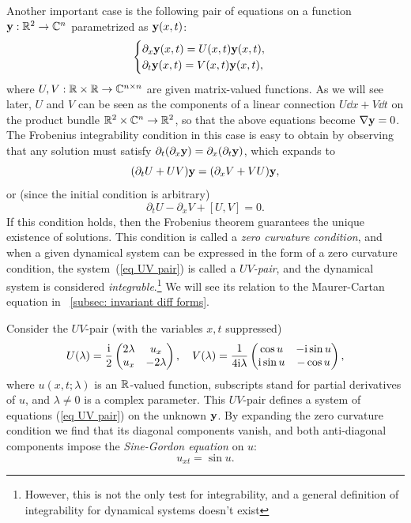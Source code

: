 \begin{example}\label{ex UV pairs}
    Another important case is the following pair of equations on a function $\bf{y}:\bbR^2\to \bbC^n$ parametrized as $\bf{y}(x,t)$:
    \[\begin{cases}
        \partial_x \bf{y}(x,t)= U(x,t)\bf{y}(x,t),\\
        \partial_t \bf{y}(x,t)= V(x,t)\bf{y}(x,t),
    \end{cases}\label{eq UV pair}\]
    where $U,V:\bbR\times\bbR\to \bbC^{n\times n}$ are given matrix-valued functions. As we will see later, $U$ and $V$ can be seen as the components of a linear connection $U\dd x+V\dd t$ on the product bundle $\bbR^2\times\bbC^n\to \bbR^2$, so that the above equations become $\nabla\bf{y}=0$. The Frobenius integrability condition in this case is easy to obtain by observing that any solution must satisfy $\partial_t(\partial_x \bf{y})=\partial_x(\partial_t \bf{y})$, which expands to 
    \[(\partial_t U+UV)\bf{y}=(\partial_x V+VU)\bf{y},\]
    or (since the initial condition is arbitrary)
    \[\partial_t U-\partial_x V+[U,V]=0.\]
    If this condition holds, then the Frobenius theorem guarantees the unique existence of solutions. This condition is called a \emph{zero curvature condition}, and when a given dynamical system can be expressed in the form of a zero curvature condition, the system~(\ref{eq UV pair}) is called a \emph{$UV$-pair}, and the dynamical system is considered \emph{integrable}.\footnote{However, this is not the only test for integrability, and a general definition of integrability for dynamical systems doesn't exist} We will see its relation to the Maurer-Cartan equation in \sect\ \ref{subsec: invariant diff forms}.
\end{example}

\begin{example}\label{ex sine-gordon}
    Consider the $UV$-pair (with the variables $x,t$ suppressed)
    \[U(\lambda)=\frac{\rmi}{2}\begin{pmatrix}
        2\lambda & u_x\\
        u_x & -2\lambda
    \end{pmatrix},\quad 
    V(\lambda)=\frac{1}{4\rmi \lambda}\begin{pmatrix}
        \cos u & -\rmi \sin u\\
        \rmi \sin u & -\cos u
    \end{pmatrix},
    \]
    where $u(x,t;\lambda)$ is an $\bbR$-valued function, subscripts stand for partial derivatives of $u$, and $\lambda\neq 0$ is a complex parameter. This $UV$-pair defines a system of equations (\ref{eq UV pair}) on the unknown $\bf{y}$. By expanding the zero curvature condition we find that its diagonal components vanish, and both anti-diagonal components impose the \emph{Sine-Gordon equation} on $u$:
    \[u_{xt}=\sin u.\]
\end{example}

